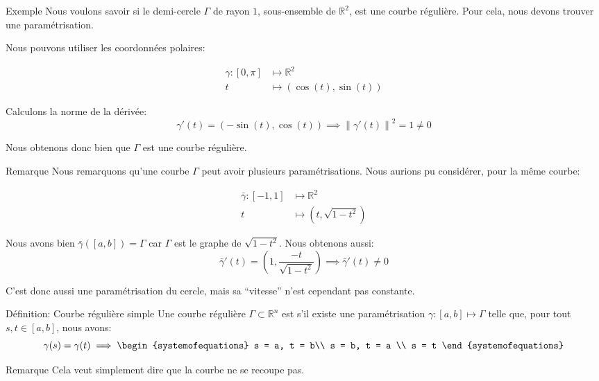 \documentclass[a4paper]{article}
\begin{document}
\begin{parag}{Exemple}
    Nous voulons savoir si le demi-cercle $\Gamma$ de rayon $1$, sous-ensemble de $\mathbb{R}^2$, est une courbe régulière. Pour cela, nous devons trouver une paramétrisation.

    Nous pouvons utiliser les coordonnées polaires:
    
    \[\begin{split}
    \gamma: \left[0, \pi\right] &\longmapsto \mathbb{R}^2 \\
    t &\longmapsto \left(\cos\left(t\right), \sin\left(t\right)\right)
    \end{split}\]
    
    Calculons la norme de la dérivée: 
    \[\gamma'\left(t\right) = \left(-\sin\left(t\right), \cos\left(t\right)\right) \implies \left\|\gamma'\left(t\right)\right\|^2 = 1 \neq 0\]
    
    Nous obtenons donc bien que $\Gamma$ est une courbe régulière.

    \begin{subparag}{Remarque}
        Nous remarquons qu'une courbe $\Gamma$ peut avoir plusieurs paramétrisations. Nous aurions pu considérer, pour la même courbe:
        
        \[\begin{split}
        \bar{\gamma}: \left[-1, 1\right] &\longmapsto \mathbb{R}^2 \\
        t &\longmapsto \left(t, \sqrt{1 - t^2}\right)
        \end{split}\]
        
        Nous avons bien $\bar{\gamma}\left(\left[a, b\right]\right) = \Gamma$ car $\Gamma$ est le graphe de $\sqrt{1 - t^2}$. Nous obtenons aussi: 
        \[\bar{\gamma}'\left(t\right) = \left(1, \frac{-t}{\sqrt{1 - t^2}}\right) \implies \bar{\gamma}'\left(t\right) \neq 0\]
        
        C'est donc aussi une paramétrisation du cercle, mais sa ``vitesse'' n'est cependant pas constante. 
    \end{subparag}
\end{parag}

\begin{parag}{Définition: Courbe régulière simple}
    Une courbe régulière $\Gamma \subset \mathbb{R}^n$ est  s'il existe une paramétrisation $\gamma: \left[a, b\right] \mapsto \Gamma$ telle que, pour tout $s, t \in \left[a, b\right]$, nous avons: 
    \[\gamma\left(s\right) = \gamma\left(t\right) \implies \begin{systemofequations} s = a, t = b\\ s = b, t = a \\ s = t \end{systemofequations}\]
    
    \begin{subparag}{Remarque}
        Cela veut simplement dire que la courbe ne se recoupe pas.
    \end{subparag}
\end{parag}
\end{document}
